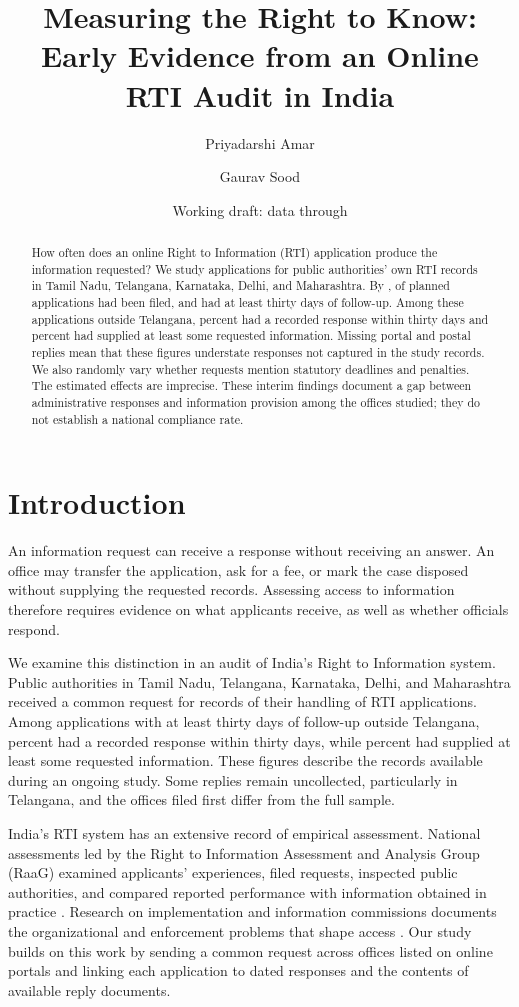 \documentclass[11pt]{article}
\title{Measuring the Right to Know:\\Early Evidence from an Online RTI Audit in India}
\author{Priyadarshi Amar \and Gaurav Sood}
\date{Working draft: data through \rtiasof{}}
\begin{document}
\maketitle
\begin{abstract}
How often does an online Right to Information (RTI) application produce the information requested? We study applications for public authorities' own RTI records in Tamil Nadu, Telangana, Karnataka, Delhi, and Maharashtra. By \rtiasof{}, \rtinfiled{} of \rtindrawn{} planned applications had been filed, and \rtinpastthirty{} had at least thirty days of follow-up. Among these applications outside Telangana, \rtianyextg{} percent had a recorded response within thirty days and \rtiinfoextg{} percent had supplied at least some requested information. Missing portal and postal replies mean that these figures understate responses not captured in the study records. We also randomly vary whether requests mention statutory deadlines and penalties. The estimated effects are imprecise. These interim findings document a gap between administrative responses and information provision among the offices studied; they do not establish a national compliance rate.
\end{abstract}

\section{Introduction}
An information request can receive a response without receiving an answer. An office may transfer the application, ask for a fee, or mark the case disposed without supplying the requested records. Assessing access to information therefore requires evidence on what applicants receive, as well as whether officials respond.

We examine this distinction in an audit of India's Right to Information system. Public authorities in Tamil Nadu, Telangana, Karnataka, Delhi, and Maharashtra received a common request for records of their handling of RTI applications. Among applications with at least thirty days of follow-up outside Telangana, \rtianyextg{} percent had a recorded response within thirty days, while \rtiinfoextg{} percent had supplied at least some requested information. These figures describe the records available during an ongoing study. Some replies remain uncollected, particularly in Telangana, and the offices filed first differ from the full sample.

India's RTI system has an extensive record of empirical assessment. National assessments led by the Right to Information Assessment and Analysis Group (RaaG) examined applicants' experiences, filed requests, inspected public authorities, and compared reported performance with information obtained in practice \citep{raag2009,raag2014}. Research on implementation and information commissions documents the organizational and enforcement problems that shape access \citep{relly2020,sns2025}. Our study builds on this work by sending a common request across offices listed on online portals and linking each application to dated responses and the contents of available reply documents.
\end{document}
